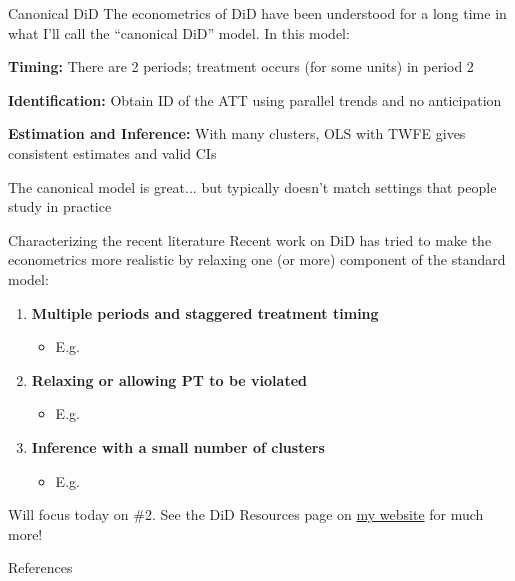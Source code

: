 \documentclass[aspectratio = 169, 12pt]{beamer}
\begin{document}
\begin{frame}{Canonical DiD}
	The econometrics of DiD have been understood for a long time in what I'll call the ``canonical DiD'' model. In this model: \medskip
	
	\begin{wideitemize}
		\item
		\textbf{Timing:} There are 2 periods; treatment occurs (for some units) in period 2
		
		\item
		\textbf{Identification:} Obtain ID of the ATT using parallel trends and no anticipation
		
		\item
		\textbf{Estimation and Inference:} With many clusters, OLS with TWFE gives consistent estimates and valid CIs
		
	\end{wideitemize}
\medskip
\pause
\noindent The canonical model is great... but typically doesn't match settings that people study in practice
	
\end{frame}


\begin{frame}{Characterizing the recent literature}
  Recent work on DiD has tried to make the econometrics more realistic by relaxing one (or more) component of the standard model: 
  \medskip

  \begin{enumerate}
    \item
    \textbf{Multiple periods and staggered treatment timing}
    	\begin{itemize}
    		\item 
    		{\footnotesize E.g. \citet[][]{borusyak_revisiting_2016, de_chaisemartin_difference--differences_2020, callaway_difference--differences_2020, sun_estimating_2020,goodman-bacon_difference--differences_2018,borusyak_revisiting_2021}}
    	\end{itemize}

    \item
    \textbf{Relaxing or allowing PT to be violated}
       \begin{itemize}
       	\item 
       	{\footnotesize E.g. \citet{roth_pre-test_2021,rambachan_more_2023,kahn-lang_promise_2020,bilinski_no_2018,freyaldenhoven_pre-event_2019,ye_negative_2021,manski_how_2017} }
       \end{itemize}

    \item
    \textbf{Inference with a small number of clusters}
     \begin{itemize}
     	\item 
     	{\footnotesize E.g. \citet{donald_inference_2007,Conley2011,Ferman2018,Hagemann2020,Hagemann2021}}
     \end{itemize}

  \end{enumerate}
  \medskip
  Will focus today on \#2. See the DiD Resources page on \hyperlink{https://www.jonathandroth.com/did-resources/}{my website} for much more!
\end{frame}


\backupbegin
\begin{frame}{References}
  
\end{frame}
\backupend
\end{document}
